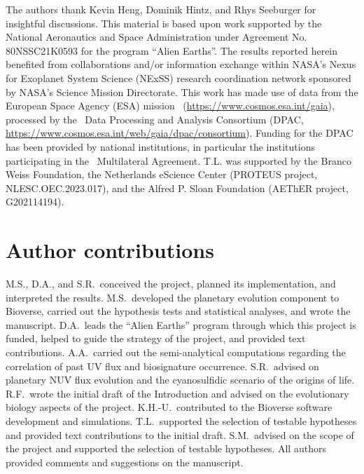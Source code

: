 \begin{acknowledgments}
    The authors thank Kevin Heng, Dominik Hintz, and Rhys Seeburger for insightful discussions.
    This material is based upon work supported by the National Aeronautics and Space Administration under Agreement No. 80NSSC21K0593 for the program ``Alien Earths''.
    The results reported herein benefited from collaborations and/or information exchange within NASA’s Nexus for Exoplanet System Science (NExSS) research coordination network sponsored by NASA’s Science Mission Directorate.
    This work has made use of data from the European Space Agency (ESA) mission \gaia\ (\url{https://www.cosmos.esa.int/gaia}), processed by the \gaia\ Data Processing and Analysis Consortium (DPAC, \url{https://www.cosmos.esa.int/web/gaia/dpac/consortium}). Funding for the DPAC has been provided by national institutions, in particular the institutions participating in the \gaia\ Multilateral Agreement.
    T.L. was supported by the Branco Weiss Foundation, the Netherlands eScience Center (PROTEUS project, NLESC.OEC.2023.017), and the Alfred P. Sloan Foundation (AEThER project, G202114194).
\end{acknowledgments}

\section*{Author contributions}
M.S., D.A., and S.R.\ conceived the project, planned its implementation, and interpreted the results.
M.S.\ developed the planetary evolution component to Bioverse, carried out the hypothesis tests and statistical analyses, and wrote the manuscript.
D.A.\ leads the ``Alien Earths'' program through which this project is funded, helped to guide the strategy of the project, and provided text contributions.
A.A.\ carried out the semi-analytical computations regarding the correlation of past UV flux and biosignature occurrence.
S.R.\ advised on planetary \gls{NUV} flux evolution and the cyanosulfidic scenario of the origins of life.
R.F.\ wrote the initial draft of the Introduction and advised on the evolutionary biology aspects of the project.
K.H.-U.\ contributed to the Bioverse software development and simulations.
T.L.\ supported the selection of testable hypotheses and provided text contributions to the initial draft.
S.M.\ advised on the scope of the project and supported the selection of testable hypotheses.
All authors provided comments and suggestions on the manuscript.


